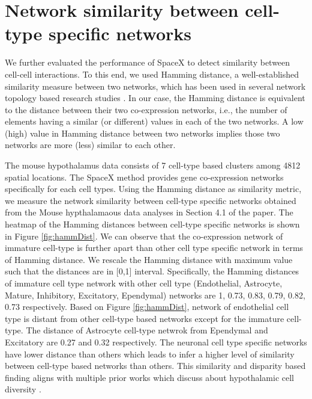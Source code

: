 \documentclass[
]{book}
\begin{document}
\hypertarget{network-similarity-between-cell-type-specific-networks}{%
\section{Network similarity between cell-type specific networks}\label{network-similarity-between-cell-type-specific-networks}}

We further evaluated the performance of SpaceX to detect similarity between cell-cell interactions. To this end, we used Hamming distance, a well-established similarity measure between two networks, which has been used in several network topology based research studies \citep{tian2005hamming, tian2006multicast, ehounou2020minimizing}. In our case, the Hamming distance is equivalent to the distance between their two co-expression networks, i.e., the number of elements having a similar (or different) values in each of the two networks. A low (high) value in Hamming distance between two networks implies those two networks are more (less) similar to each other.

The mouse hypothalamus data consists of 7 cell-type based clusters among 4812 spatial locations. The SpaceX method provides gene co-expression networks specifically for each cell types. Using the Hamming distance as similarity metric, we measure the network similarity between cell-type specific networks obtained from the Mouse hypthalamaous data analyses in Section 4.1 of the paper. The heatmap of the Hamming distances between cell-type specific networks is shown in Figure \ref{fig:hammDist}. We can observe that the co-expression network of immature cell-type is further apart than other cell type specific network in terms of Hamming distance. We rescale the Hamming distance with maximum value such that the distances are in {[}0,1{]} interval. Specifically, the Hamming distances of immature cell type network with other cell type (Endothelial, Astrocyte, Mature, Inhibitory, Excitatory, Ependymal) networks are 1, 0.73, 0.83, 0.79, 0.82, 0.73 respectively. Based on Figure \ref{fig:hammDist}, network of endothelial cell type is distant from other cell-type based networks except for the immature cell-type. The distance of Astrocyte cell-type netwrok from Ependymal and Excitatory are 0.27 and 0.32 respectively. The neuronal cell type specific networks have lower distance than others which leads to infer a higher level of similarity between cell-type based networks than others. This similarity and disparity based finding aligns with multiple prior works which discuss about hypothalamic cell diversity \citep{chen2017single, mickelsen2020cellular}.
\end{document}
